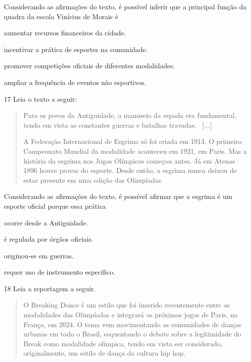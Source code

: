 Considerando as afirmações do texto, é possível inferir que a principal 
função da quadra da escola Vinícius de Morais é

\begin{escolha}
\item aumentar recursos financeiros da cidade.

\item incentivar a prática de esportes na comunidade.

\item promover competições oficiais de diferentes modalidades.

\item ampliar a frequência de eventos não esportivos.
\end{escolha}

\pagebreak
\num{17} Leia o texto a seguir:

\begin{quote}
Para os povos da Antiguidade, o manuseio da espada era fundamental,
tendo em vista as constantes guerras e batalhas travadas.~ {[}...{]}

A Federação Internacional de Esgrima só foi criada em 1913. O primeiro
Campeonato Mundial da modalidade aconteceu em 1921, em Paris. Mas a
história da esgrima nos Jogos Olímpicos começou antes. Já em Atenas--1896
houve provas do esporte. Desde então, a esgrima nunca deixou de estar
presente em uma edição das Olimpíadas.

\end{quote}

Considerando as afirmações do texto, é possível afirmar que a esgrima é
um esporte oficial porque essa prática

\begin{escolha}
\item ocorre desde a Antiguidade.

\item é regulada por órgãos oficiais.

\item originou-se em guerras.

\item requer uso de instrumento específico.
\end{escolha}

\num{18}  Leia a reportagem a seguir.

\begin{quote}
O Breaking Dance é um estilo que foi inserido recentemente entre as
modalidades das Olimpíadas e integrará os próximos jogos de Paris, na
França, em 2024. O tema vem movimentando as comunidades de danças
urbanas em todo o Brasil, esquentando o debate sobre a legitimidade do
Break como modalidade olímpica, tendo em vista ser considerado,
originalmente, um estilo de dança da cultura hip hop.

\end{quote}

